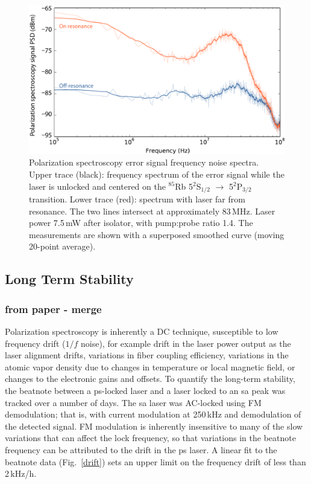\begin{figure}[hbp]
    \centering
    \includegraphics[width=\linewidth]{chapter1/Figs/fig3_v1.pdf}
    \caption{Polarization spectroscopy error signal frequency noise spectra.
Upper trace (black): frequency spectrum of the error signal while the laser is unlocked and centered on the $^{85}$Rb 5$^\text{2}$S$_\text{1/2}$ $\rightarrow$ 5$^\text{2}$P$_\text{3/2}$ transition.
Lower trace (red): spectrum with laser far from resonance.
The two lines intersect at approximately 83\,MHz.
Laser power 7.5\,mW after isolator, with pump:probe ratio 1.4.
The measurements are shown with a superposed smoothed curve (moving 20-point average).}
    \label{bandwidth}
\end{figure}

\subsection{Long Term Stability}
\subsubsection{from paper - merge}
Polarization spectroscopy is inherently a DC technique, susceptible to low frequency drift ($1/f$ noise), for example drift in the laser power output as the laser alignment drifts, variations in fiber coupling efficiency, variations in the atomic vapor density due to changes in temperature or local magnetic field, or changes to the electronic gains and offsets.
To quantify the long-term stability, the beatnote between a \gls*{ps}-locked laser and a laser locked to an \gls*{sa} peak was tracked over a number of days.
The \gls*{sa} laser was AC-locked using FM demodulation; that is, with current modulation at 250\,kHz and demodulation of the detected signal.
FM modulation is inherently insensitive to many of the slow variations that can affect the lock frequency, so that variations in the beatnote frequency can be attributed to the drift in the \gls*{ps} laser.
A linear fit to the beatnote data (Fig.~\ref{drift}) sets an upper limit on the frequency drift of less than 2\,kHz/h. 

